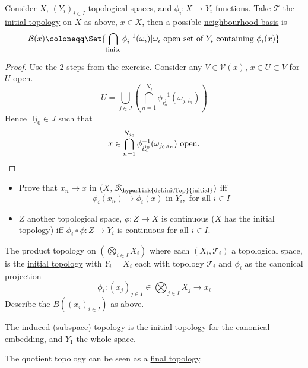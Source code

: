 \documentclass[twoside]{article}
\begin{document}
\begin{prop}
    Consider $X$, $(Y_i)_{i \in I}$ topological spaces, and $\phi_i:X \to Y_i$ functions.
    Take $\mathscr{T}$ the \hyperlink{def:initTop}{initial topology} on $X$ as above, $x \in X$, then a possible \hyperlink{def:neighbourhood}{neighbourhood basis} is
    \begin{equation*}
        \mathcal{B}(x) \coloneqq \Set{\bigcap_{\text{finite}} \phi_i^{-1}(\omega_i) | \omega_i \text{ open set of } Y_i \text{ containing }\phi_i(x)}
    \end{equation*}
\end{prop}
\begin{proof}
    Use the 2 steps from the exercise. Consider any $V \in \mathcal{V}(x)$, $x \in U \subset V$ for $U$ open.
    \begin{equation*}
        U = \bigcup_{j \in J} \left(\bigcap_{n =1}^{N_j} \phi_{i_n^j}^{-1} (\omega_{j, i_n})\right)
    \end{equation*}
    Hence $\exists j_0 \in J$ such that
    \begin{equation*}
        x \in \bigcap_{n=1}^{N_{j_0}} \phi_{i_n^{j_0}}^{-1} (\omega_{j_0, i_n}) \text{ open}. \qedhere
    \end{equation*}
\end{proof}
\begin{ex}\leavevmode
    \begin{itemize}
        \item Prove that $x_n \to x$ in $(X, \mathscr{T}_{\text{\hyperlink{def:initTop}{initial}}})$ iff
            \begin{equation*}
                \phi_i(x_n) \to \phi_i(x) \text{ in } Y_i, \text{ for all } i \in I
            \end{equation*}
        \item $Z$ another topological space, $\phi: Z \to X$ is continuous ($X$ has the initial topology) iff $\phi_i \circ \phi: Z \to Y_i$ is continuous for all $i \in I$.
    \end{itemize}
\end{ex}
\begin{remark}
    The product topology on $(\bigotimes_{i \in I} X_i)$ where each $(X_i, \mathscr{T}_i)$ a topological space, is the \hyperlink{def:initTop}{initial topology} with $Y_i = X_i$ each with topology $\mathcal{T}_i$ and $\phi_i$ as the canonical projection
    \begin{equation*}
        \phi_i: (x_j)_{j \in I} \in \bigotimes_{j \in I} X_j \to x_i
    \end{equation*}
    Describe the $B((x_i)_{i \in I})$ as above.

    The induced (subspace) topology is the initial topology for the canonical embedding, and $Y_1$ the whole space.

    The quotient topology can be seen as a \hyperlink{def:finalTop}{final topology}.
\end{remark}
\end{document}

